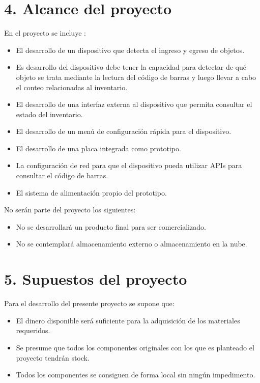 \documentclass[
11pt, %
codirector, %
]{charter}
\begin{document}
\section{4. Alcance del proyecto}
\label{sec:alcance}

En el proyecto se incluye :

\begin{itemize}
	\item El desarrollo de un dispositivo que detecta el ingreso y egreso de objetos.
	\item Es desarrollo del dispositivo debe tener la capacidad para detectar de qué objeto se trata mediante la lectura del código de barras y luego llevar a cabo el conteo relacionadas al inventario.
 	\item El desarrollo de una interfaz externa al dispositivo que permita consultar el estado del inventario.
  \item El desarrollo de un menú de configuración rápida para el dispositivo.
  \item El desarrollo de una placa integrada como prototipo.
  \item La configuración de red para que el dispositivo pueda utilizar APIs para consultar el código de barras.
  \item El sistema de alimentación propio del prototipo.
  
\end{itemize}

No serán parte del proyecto los siguientes:

\begin{itemize}
	\item No se desarrollará un producto final para ser comercializado.
	\item No se contemplará almacenamiento externo o almacenamiento en la nube.
  
\end{itemize}

\section{5. Supuestos del proyecto}
\label{sec:supuestos}


Para el desarrollo del presente proyecto se supone que:

\begin{itemize}
	\item El dinero disponible será suficiente para la adquisición de los materiales requeridos.
	\item Se presume que todos los componentes originales con los que es planteado el proyecto tendrán stock.
 \item Todos los componentes se consiguen de forma local sin ningún impedimento.
  
\end{itemize}
\end{document}
